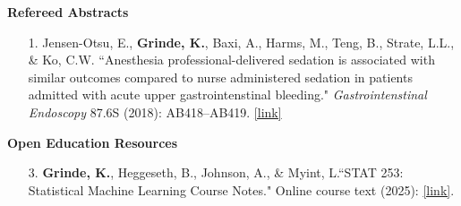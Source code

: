 \documentclass[margin]{res}
\newcommand{\annotateItem}[1]{
	\begin{itemize} \vspace{-0.1cm}
	\item[] 
	\begin{footnotesize}\textcolor{black}{(#1)}\end{footnotesize}
	\end{itemize} \vspace{-0.1cm}
}
\begin{document}
\begin{resume}
	
\pagebreak	
\textbf{Refereed Abstracts}
\begin{itemize}
\item[1.] Jensen-Otsu, E., \textbf{Grinde, K.}, Baxi, A., Harms, M., Teng, B., Strate, L.L., \& Ko, C.W. 
``Anesthesia professional-delivered sedation is associated with similar outcomes compared to nurse administered sedation in patients admitted with acute upper gastrointenstinal bleeding." \textit{Gastrointenstinal Endoscopy} 87.6S (2018):  AB418--AB419. %
\href{https://www.giejournal.org/article/S0016-5107(18)32182-5/fulltext}{[link]}

\end{itemize}



\textbf{Open Education Resources}

\begin{itemize}
\item[3.] \textbf{Grinde, K.}, Heggeseth, B., Johnson, A., \& Myint, L.``STAT 253: Statistical Machine Learning Course Notes." Online course text (2025): \href{https://kegrinde.github.io/STAT253/}{[link]}. 


\end{itemize}
\end{resume}
\end{document}
